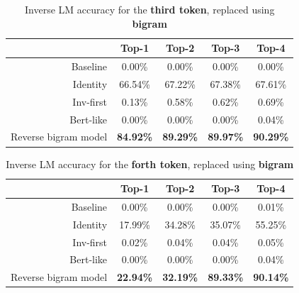 \documentclass[../thesis.tex]{subfiles}
\begin{document}
\begin{table}[bthp]
\centering
\begin{tabular}{rcccc}
\toprule
                      & \textbf{Top-1}    & \textbf{Top-2}    & \textbf{Top-3}    & \textbf{Top-4}    \\
\midrule
Baseline              & 0.00\%            & 0.00\%            & 0.00\%            & 0.00\%            \\
Identity              & 66.54\%           & 67.22\%           & 67.38\%           & 67.61\%           \\
Inv-first             & 0.13\%            & 0.58\%            & 0.62\%            & 0.69\%            \\
Bert-like             & 0.00\%            & 0.00\%            & 0.00\%            & 0.04\%            \\
Reverse bigram model  & \textbf{84.92\%}  & \textbf{89.29\%}  & \textbf{89.97\%}  & \textbf{90.29\%}  \\
\bottomrule
\end{tabular}
\vspace{0.25cm}
\caption{Inverse LM accuracy for the \textbf{third token}, replaced using \textbf{bigram}}
\label{table:tinystories__inversion_third_token_bigram}
\end{table}


\begin{table}[bthp]
\centering
\begin{tabular}{rcccc}
\toprule
                      & \textbf{Top-1}    & \textbf{Top-2}    & \textbf{Top-3}    & \textbf{Top-4}    \\
\midrule
Baseline              & 0.00\%            & 0.00\%            & 0.00\%            & 0.01\%            \\
Identity              & 17.99\%           & 34.28\%           & 35.07\%           & 55.25\%           \\
Inv-first             & 0.02\%            & 0.04\%            & 0.04\%            & 0.05\%            \\
Bert-like             & 0.00\%            & 0.00\%            & 0.00\%            & 0.04\%            \\
Reverse bigram model  & \textbf{22.94\%}  & \textbf{32.19\%}  & \textbf{89.33\%}  & \textbf{90.14\%}  \\
\bottomrule
\end{tabular}
\vspace{0.25cm}
\caption{Inverse LM accuracy for the \textbf{forth token}, replaced using \textbf{bigram}}
\label{table:tinystories__inversion_fourth_token_bigram}
\end{table}
\end{document}
